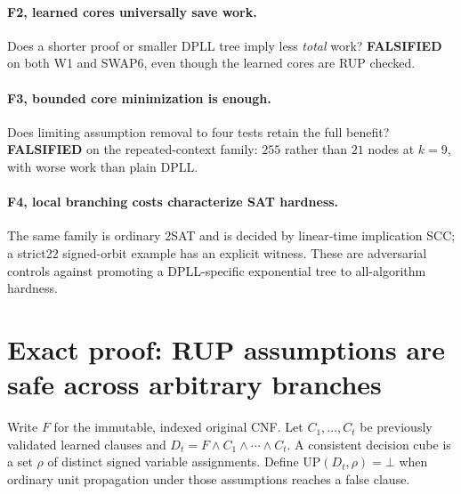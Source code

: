 \documentclass[10pt]{article}
\begin{document}
\paragraph{F2, learned cores universally save work.} Does a shorter proof or
smaller DPLL tree imply less \emph{total} work? \textbf{FALSIFIED} on both W1 and
SWAP6, even though the learned cores are RUP checked.
\paragraph{F3, bounded core minimization is enough.} Does limiting assumption
removal to four tests retain the full benefit? \textbf{FALSIFIED} on the
repeated-context family: $255$ rather than $21$ nodes at $k=9$, with worse work
than plain DPLL.
\paragraph{F4, local branching costs characterize SAT hardness.} The same
family is ordinary 2SAT and is decided by linear-time implication SCC; a
strict22 signed-orbit example has an explicit witness. These are adversarial
controls against promoting a DPLL-specific exponential tree to all-algorithm
hardness.

\section{Exact proof: RUP assumptions are safe across arbitrary branches}
Write $F$ for the immutable, indexed original CNF. Let $C_1,\ldots,C_t$ be
previously validated learned clauses and $D_t=F\land C_1\land\cdots\land C_t$.
A consistent decision cube is a set $\rho$ of distinct signed variable
assignments. Define $\mathrm{UP}(D_t,\rho)=\bot$ when ordinary unit propagation
under those assumptions reaches a false clause.
\end{document}

